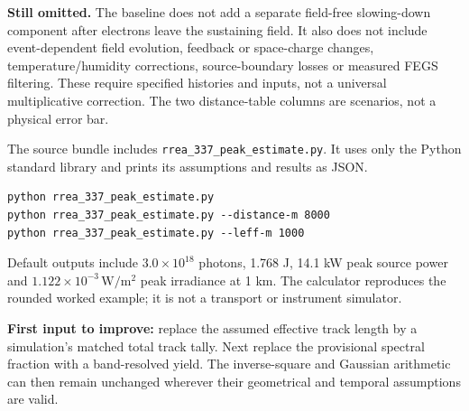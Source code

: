 \documentclass[11pt,a4paper]{article}
\begin{document}
\textbf{Still omitted.} The baseline does not add a separate field-free slowing-down component after electrons leave the sustaining field. It also does not include event-dependent field evolution, feedback or space-charge changes, temperature/humidity corrections, source-boundary losses or measured FEGS filtering. These require specified histories and inputs, not a universal multiplicative correction. The two distance-table columns are scenarios, not a physical error bar.

\begin{keybox}
The source bundle includes \texttt{rrea\_337\_peak\_estimate.py}. It uses only the Python standard library and prints its assumptions and results as JSON.
\begin{verbatim}
python rrea_337_peak_estimate.py
python rrea_337_peak_estimate.py --distance-m 8000
python rrea_337_peak_estimate.py --leff-m 1000
\end{verbatim}
Default outputs include $3.0\times10^{18}$ photons, 1.768 J, 14.1 kW peak source power and $1.122\times10^{-3}\,\mathrm{W/m^2}$ peak irradiance at 1 km. The calculator reproduces the rounded worked example; it is not a transport or instrument simulator.
\end{keybox}

\textbf{First input to improve:} replace the assumed effective track length by a simulation's matched total track tally. Next replace the provisional spectral fraction with a band-resolved yield. The inverse-square and Gaussian arithmetic can then remain unchanged wherever their geometrical and temporal assumptions are valid.

\clearpage
{}
\end{document}

